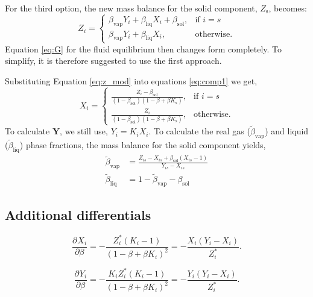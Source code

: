 \documentclass[internal,english]{sintefmemo2012}
\newcommand*{\pd}[3][]{\frac{\partial^{#1}#2}{\partial{#3}^{#1}}}%
\newcommand*{\vektor}[1]{\boldsymbol{#1}}%
\newcommand{\sol}{\text{sol}}
\newcommand{\liq}{\text{liq}}
\newcommand{\vap}{\text{vap}}
\newcommand{\scomp}{\text{s}\xspace}
\begin{document}
For the third option, the new mass balance for the solid component, $Z_\scomp$, becomes:
\begin{equation}
  Z_i = \begin{cases}
    \beta_\vap Y_i + \beta_\liq X_i + \beta_\sol,& \text{if } i = s\\
    \beta_\vap Y_i + \beta_\liq X_i,            & \text{otherwise}.
\end{cases}
\end{equation}
Equation \ref{eq:G} for the fluid equilibrium then changes form completely. To simplify, it is therefore suggested to use the first approach.

Substituting Equation \ref{eq:z_mod} into equations \ref{eq:comp1} we get,
\begin{equation}
  X_i = \begin{cases}
    \frac{Z_i - \beta_\sol}{\left(1-\beta_\sol\right)\left(1-\beta+\beta K_\scomp\right)},& \text{if } i = s\\
    \frac{Z_i}{\left(1-\beta_\sol\right)\left(1-\beta+\beta K_\scomp\right)},            & \text{otherwise}.
\end{cases}
 \end{equation}
To calculate $\vektor{Y}$, we still use, $Y_i=K_iX_i$.
To calculate the real gas ($\tilde{\beta}_\vap$) and liquid ($\tilde{\beta}_\liq$) phase fractions, the mass balance for the solid component yields,
\begin{align}
  \tilde{\beta}_\vap &= \frac{Z_{is} - X_{is} +
    \beta_\sol \left( X_{is} - 1\right)}{Y_{is}-X_{is}} \\
  \tilde{\beta}_\liq &= 1 - \tilde{\beta}_\vap - \beta_\sol
\end{align}
\subsection{Additional differentials}
\begin{equation}
   \pd{X_i}{\beta} = -\frac{Z_i^*\left(K_i - 1\right)}{\left(1-\beta+\beta K_i\right)^2} = -\frac{X_i\left(Y_i - X_i\right)}{Z_i^*}.
\end{equation}

\begin{equation}
   \pd{Y_i}{\beta} = -\frac{K_i Z_i^* \left(K_i - 1\right)}{\left(1-\beta+\beta K_i\right)^2} = -\frac{Y_i\left(Y_i - X_i\right)}{Z_i^*}.
\end{equation}
\end{document}
